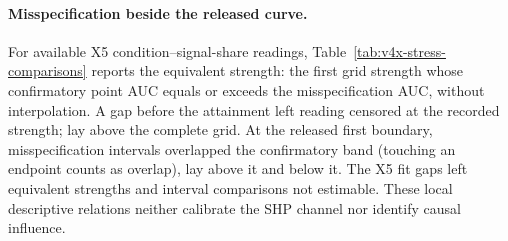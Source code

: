 \paragraph{Misspecification beside the released curve.}
For  available X5 condition--signal-share readings, Table~\ref{tab:v4x-stress-comparisons} reports the equivalent strength: the first grid strength whose confirmatory point AUC equals or exceeds the misspecification AUC, without interpolation. A gap before the attainment left  reading censored at the recorded strength;  lay above the complete grid. At the released first boundary,  misspecification intervals overlapped the confirmatory band (touching an endpoint counts as overlap),  lay above it and  below it. The X5 fit gaps left  equivalent strengths and  interval comparisons not estimable. These local descriptive relations neither calibrate the SHP channel nor identify causal influence.







\clearpage
